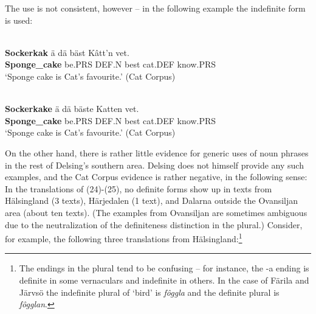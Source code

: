 
\ea
	\z 
\z

The use is not consistent, however – in the following example the indefinite form is used:


\ea\label{}
\\
\gll 	\textbf{Sockerkak} ä  dä  bäst  Kâtt’n  vet.\\
		\textbf{Sponge\_cake} be.PRS  DEF.N  best  cat.DEF  know.PRS\\
\glt ‘Sponge cake is Cat’s favourite.’ (Cat Corpus)

\z

\ea\label{}
\\
\gll 	\textbf{Sockerkake} ä  dä  bäste  Katten  vet.\\
		\textbf{Sponge\_cake} be.PRS  DEF.N  best  cat.DEF  know.PRS\\
\glt 	‘Sponge cake is Cat’s favourite.’ (Cat Corpus)

\z

On the other hand, there is rather little evidence for generic uses of noun phrases in the rest of Delsing’s southern area. Delsing does not himself provide any such examples, and the Cat Corpus evidence is rather negative, in the following sense: In the translations of (24){}-(25), no definite forms show up in texts from Hälsingland (3 texts), Härjedalen (1 text), and Dalarna outside the Ovansiljan area (about ten texts). (The examples from Ovansiljan are sometimes ambiguous due to the neutralization of the definiteness distinction in the plural.) Consider, for example, the following three translations from Hälsingland:\footnote{ The endings in the plural tend to be confusing – for instance, the -a ending is definite in some vernaculars and indefinite in others. In the case of Färila and Järvsö the indefinite plural of ‘bird’ is \textit{fôggla} and the definite plural is \textit{fôgglan}. }

